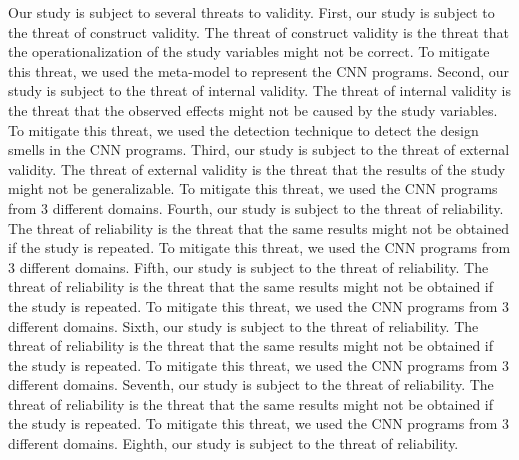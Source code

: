 \label{threats}

Our study is subject to several threats to validity. First, our study is subject
to the threat of construct validity. The threat of construct validity is the
threat that the operationalization of the study variables might not be correct.
To mitigate this threat, we used the meta-model to represent the CNN programs.
Second, our study is subject to the threat of internal validity. The threat of
internal validity is the threat that the observed effects might not be caused by
the study variables. To mitigate this threat, we used the detection technique to
detect the design smells in the CNN programs. Third, our study is subject to the
threat of external validity. The threat of external validity is the threat that
the results of the study might not be generalizable. To mitigate this threat, we
used the CNN programs from 3 different domains. Fourth, our study is subject to
the threat of reliability. The threat of reliability is the threat that the same
results might not be obtained if the study is repeated. To mitigate this threat,
we used the CNN programs from 3 different domains. Fifth, our study is subject
to the threat of reliability. The threat of reliability is the threat that the
same results might not be obtained if the study is repeated. To mitigate this
threat, we used the CNN programs from 3 different domains. Sixth, our study is
subject to the threat of reliability. The threat of reliability is the threat
that the same results might not be obtained if the study is repeated. To
mitigate this threat, we used the CNN programs from 3 different domains.
Seventh, our study is subject to the threat of reliability. The threat of
reliability is the threat that the same results might not be obtained if the
study is repeated. To mitigate this threat, we used the CNN programs from 3
different domains. Eighth, our study is subject to the threat of reliability.




























